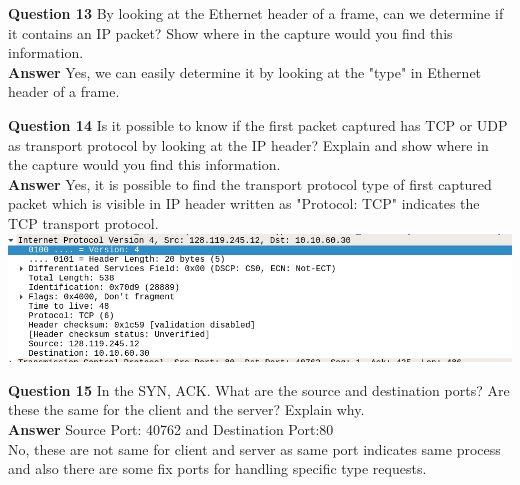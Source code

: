\documentclass[14pt]{extarticle}
\begin{document}
    \noindent
    \textbf{\large Question 13}
    By looking at the Ethernet header of a frame, can we determine if it contains an IP packet?
Show where in the capture would you find this information.\\[10pt]
    \textbf{\large Answer}
    Yes, we can easily determine it by looking at the "type" in Ethernet header of a frame.
    \vspace{1cm}
    
    \noindent
    \textbf{\large Question 14}
    Is it possible to know if the first packet captured has TCP or UDP as transport protocol by
looking at the IP header? Explain and show where in the capture would you find this
information.\\[10pt]
    \textbf{\large Answer}
    Yes, it is possible to find the transport protocol type of first captured packet 
    which is visible in IP header written as "Protocol: TCP" indicates the TCP transport protocol.\\[10pt]
    \includegraphics[scale=0.5]{14}
    \vspace{1cm}
    
    \noindent
    \textbf{\large Question 15}
    In the SYN, ACK. What are the source and destination ports? Are these the same for the
client and the server? Explain why.\\[10pt]
    \textbf{\large Answer}
    Source Port: 40762 and Destination Port:80\\
    No, these are not same for client and server as same port indicates same process 
    and also there are some fix ports for handling specific type requests.
    \vspace{1cm}
\end{document}
